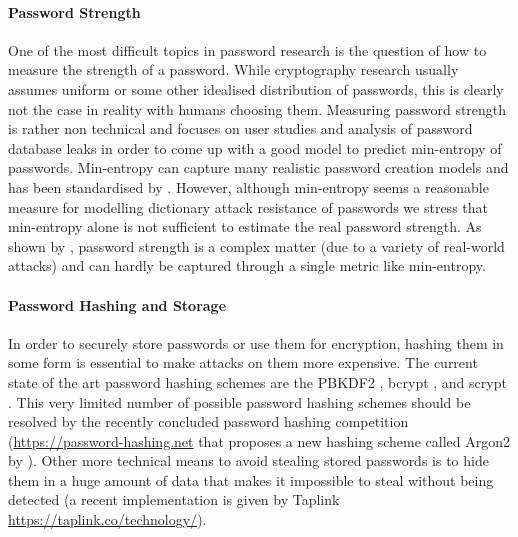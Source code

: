 \paragraph{Password Strength}
One of the most difficult topics in password research is the question of how to measure the strength of a password.
While cryptography research usually assumes uniform or some other idealised distribution of passwords, this is clearly not the case in reality with humans choosing them.
Measuring password strength is rather non technical and focuses on user studies and analysis of password database leaks \cite{ShayKKLMBCC10,KomanduriSKMBCCE11,MazurekKVBCCKSU13} in order to come up with a good model to predict min-entropy of passwords.
Min-entropy can capture many realistic password creation models and has been standardised by \citet{nist800}.
However, although min-entropy seems a reasonable measure for modelling dictionary attack resistance of passwords we stress that min-entropy alone is not sufficient to estimate the real password strength. 
As shown by \citet{MazurekKVBCCKSU13}, password strength is a complex matter (due to a variety of real-world attacks) and can hardly be captured through a single metric like min-entropy.

\paragraph{Password Hashing and Storage}
In order to securely store passwords or use them for encryption, hashing them in some form is essential to make attacks on them more expensive.
The current state of the art password hashing schemes are the \ac{PBKDF2} \cite{rfc2898}, bcrypt \cite{ProvosM99}, and scrypt \cite{rfcScrypt}.
This very limited number of possible password hashing schemes should be resolved by the recently concluded password hashing competition (\url{https://password-hashing.net} that proposes a new hashing scheme called Argon2 by \citet{Biryukov15}).
Other more technical means to avoid stealing stored passwords is to hide them in a huge amount of data that makes it impossible to steal without being detected (a recent implementation is given by Taplink \url{https://taplink.co/technology/}).

